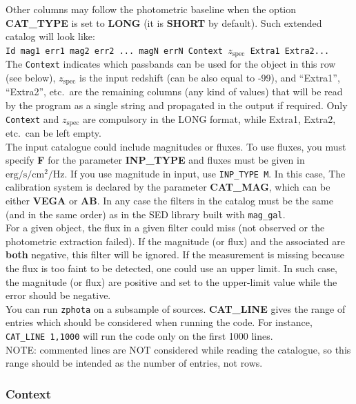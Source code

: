 \documentclass[12pt]{article}
\begin{document}
Other columns may follow the photometric baseline when the option \textbf{CAT\_TYPE} is set to \textbf{LONG} (it is \textbf{SHORT} by default). Such extended catalog will look like: \\
\texttt{Id mag1 err1 mag2 err2 ...  magN errN Context  $z_\mathrm{spec}$  Extra1 Extra2...}\\
The \texttt{Context} indicates which passbands can be used for the object in this row (see below), $z_\mathrm{spec}$ is the input redshift (can be also equal to -99), and ``Extra1'', ``Extra2'', etc.~are  the  remaining columns  (any kind of values) that will be read by the program as a single string and propagated in the output if required.  Only \texttt{Context} and $z_\mathrm{spec}$ are compulsory in the LONG format, while Extra1, Extra2, etc.~can be left empty.\\

The input catalogue could include magnitudes or fluxes. To use fluxes, you must specify \textbf{F} for the parameter \textbf{INP\_TYPE} and fluxes must be given in  $\mathrm{erg}/\mathrm{s}/\mathrm{cm}^2/\mathrm{Hz}$. If you use magnitude in input, use \texttt{INP\_TYPE M}. In this case, The calibration system is declared by the parameter \textbf{CAT\_MAG}, which can be either \textbf{VEGA} or \textbf{AB}. In any case the filters in the catalog must be the same (and in the same order) as in the SED library built with \texttt{mag\_gal}. \\

For a given object, the flux in a given filter could miss (not observed or the photometric extraction failed). If the magnitude (or flux) and the associated are {\bf both} negative, this filter will be ignored. If the measurement is missing because the flux is too faint to be detected, one could use an upper limit. In such case, the magnitude (or flux) are positive and set to the upper-limit value while the error should be negative. \\

You can run \texttt{zphota} on a subsample of sources. \textbf{CAT\_LINE} gives the range of entries which should be considered when running the code. For instance, \texttt{CAT\_LINE 1,1000} will run the code only on the first 1000 lines. \\
NOTE: commented lines are NOT considered while reading the catalogue, so this range should be intended as the number of entries, not rows.


% 
\subsubsection{Context}\label{context}
\end{document}
